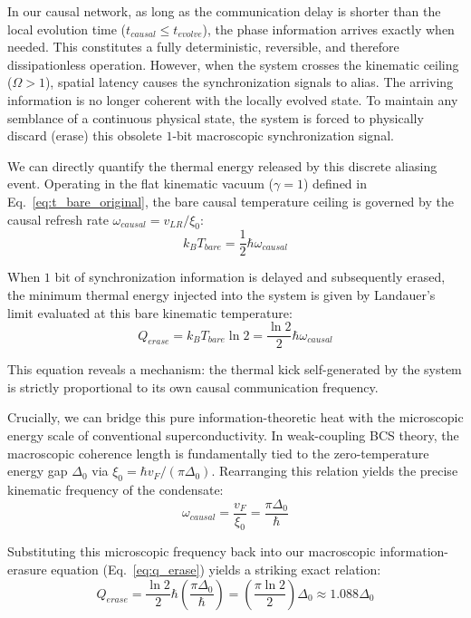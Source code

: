 \documentclass[11pt,a4paper]{article}
\begin{document}
In our causal network, as long as the communication delay is shorter than the local evolution time ($t_{causal} \le t_{evolve}$), the phase information arrives exactly when needed. This constitutes a fully deterministic, reversible, and therefore dissipationless operation. However, when the system crosses the kinematic ceiling ($\Omega > 1$), spatial latency causes the synchronization signals to alias. The arriving information is no longer coherent with the locally evolved state. To maintain any semblance of a continuous physical state, the system is forced to physically discard (erase) this obsolete $1$-bit macroscopic synchronization signal.

We can directly quantify the thermal energy released by this discrete aliasing event. Operating in the flat kinematic vacuum ($\gamma=1$) defined in Eq.~\eqref{eq:t_bare_original}, the bare causal temperature ceiling is governed by the causal refresh rate $\omega_{causal} = v_{LR}/\xi_0$:
\begin{equation}
\label{eq:t_bare_causal}
    k_B T_{bare} = \frac{1}{2}\hbar \omega_{causal}
\end{equation}

When $1$ bit of synchronization information is delayed and subsequently erased, the minimum thermal energy injected into the system is given by Landauer's limit evaluated at this bare kinematic temperature:
\begin{equation}
\label{eq:q_erase}
    Q_{erase} = k_B T_{bare} \ln 2 = \frac{\ln 2}{2} \hbar \omega_{causal}
\end{equation}

This equation reveals a mechanism: the thermal kick self-generated by the system is strictly proportional to its own causal communication frequency. 

Crucially, we can bridge this pure information-theoretic heat with the microscopic energy scale of conventional superconductivity. In weak-coupling BCS theory, the macroscopic coherence length is fundamentally tied to the zero-temperature energy gap $\Delta_0$ via $\xi_0 = \hbar v_F / (\pi \Delta_0)$. Rearranging this relation yields the precise kinematic frequency of the condensate:
\begin{equation}
\label{eq:omega_causal_bcs}
    \omega_{causal} = \frac{v_F}{\xi_0} = \frac{\pi \Delta_0}{\hbar}
\end{equation}

Substituting this microscopic frequency back into our macroscopic information-erasure equation (Eq.~\ref{eq:q_erase}) yields a striking exact relation:
\begin{equation}
\label{eq:q_erase_delta}
    Q_{erase} = \frac{\ln 2}{2} \hbar \left( \frac{\pi \Delta_0}{\hbar} \right) = \left( \frac{\pi \ln 2}{2} \right) \Delta_0 \approx 1.088 \Delta_0
\end{equation}
\end{document}
